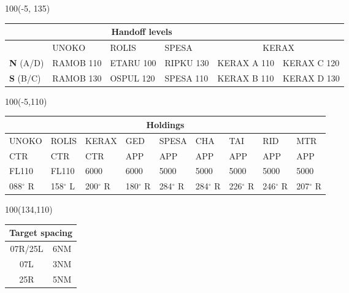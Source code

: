 \documentclass[10pt,landscape,a4paper]{article}
\begin{document}
\begin{textblock}{100}(-5, 135)
\begin{table}[]
\begin{tabular}{|l|l|l|l||l|l|}
\multicolumn{5}{c}{\textbf{Handoff levels}}              \\ \hline
           & UNOKO     & ROLIS     & SPESA     & \multicolumn{2}{c|}{KERAX}     \\ \hline
\textbf{N} (A/D) & RAMOB 110 & ETARU 100 & RIPKU 130 & KERAX A 110 & KERAX C 120\\
\textbf{S} (B/C) & RAMOB 130 & OSPUL 120 & SPESA 110 & KERAX B 110 & KERAX D 130\\ \hline
\end{tabular}
\end{table}
\end{textblock}

\begin{textblock}{100}(-5,110)
\begin{table}[]
\begin{tabular}{|l|l|l|l|l|l|l|l|l|}

\multicolumn{9}{c}{\textbf{Holdings}}                                        \\ \hline
UNOKO  & ROLIS  & KERAX  & GED    & SPESA  & CHA    & TAI    & RID    & MTR    \\ \hline
CTR    & CTR    & CTR    & APP    & APP    & APP    & APP    & APP    & APP    \\
FL110  & FL110  & 6000   & 6000   & 5000   & 5000   & 5000   & 5000   & 5000   \\
088$^\circ$ R & 158$^\circ$ L & 200$^\circ$ R & 180$^\circ$ R & 284$^\circ$ R & 284$^\circ$ R & 226$^\circ$ R & 246$^\circ$ R & 207$^\circ$ R \\ \hline
\end{tabular}
\end{table}
\end{textblock}

\begin{textblock}{100}(134,110)
\begin{table}[]
\begin{tabular}{|c|l|}
\multicolumn{2}{c}{\textbf{Target spacing}} \\ \hline
07R/25L  & 6NM  \\ \hline
07L      & 3NM  \\ \hline
25R      & 5NM  \\ \hline
\end{tabular}
\end{table}
\end{textblock}
\end{document}
